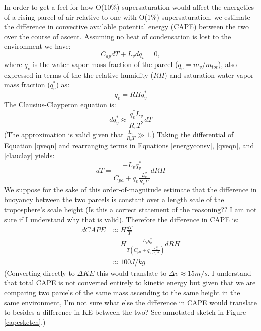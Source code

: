 \documentclass{article}
\begin{document}
In order to get a feel for how O(10\%) supersaturation would affect the energetics of a rising parcel of air relative to one with O(1\%) supersaturation, we estimate the difference in convective available potential energy (CAPE) between the two over the course of ascent. Assuming no heat of condensation is lost to the environment we have:
\begin{equation}
\label{energyconsv}
C_{ap}dT + L_vdq_v = 0,
\end{equation}
where $q_v$ is the water vapor mass fraction of the parcel ($q_v=m_v/m_{tot}$), also expressed in terms of the the relative humidity ($RH$) and saturation water vapor mass fraction ($q_v^*$) as:
\begin{equation}
\label{qveqn}
q_v = RHq_v^*
\end{equation}
The Clausius-Clayperon equation is:
\begin{equation}
\label{clauclay}
dq_v^* \approx \frac{q_v^*L_v}{R_vT^2}dT
\end{equation}
(The approximation is valid given that $\frac{L_v}{R_vT} \gg 1$.) Taking the differential of Equation \ref{qveqn} and rearranging terms in Equations \ref{energyconsv}, \ref{qveqn}, and \ref{clauclay} yields:
\begin{equation}
dT = \frac{-L_vq_v^*}{C_{pa} + q_v\frac{L_v^2}{R_vT^2}}dRH
\end{equation}
We suppose for the sake of this order-of-magnitude estimate that the difference in buoyancy between the two parcels is constant over a length scale of the troposphere's scale height (Is this a correct statement of the reasoning?? I am not sure if I understand why that is valid). Therefore the difference in CAPE is:
\begin{align}
dCAPE &\approx H \frac{dT}{T}\nonumber\\
&=H\frac{-L_vq_v^*}{T(C_{pa} + q_v\frac{L_v^2}{R_vT^2})}dRH\nonumber\\
&\approx 100 J/kg
\end{align}
(Converting directly to $\Delta KE$ this would translate to $ \Delta v\approx 15m/s$. I understand that total CAPE is not converted entirely to kinetic energy but given that we are comparing two parcels of the same mass ascending to the same height in the same environment, I'm not sure what else the difference in CAPE would translate to besides a difference in KE between the two? See annotated sketch in Figure \ref{capesketch}.)
\end{document}
